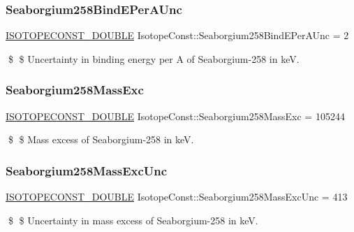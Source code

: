 \subsubsection{\texorpdfstring{Seaborgium258\+Bind\+E\+Per\+A\+Unc}{Seaborgium258BindEPerAUnc}}
{\footnotesize\ttfamily \mbox{\hyperlink{group___isotope_const-_macros_ga8f45a7272ce02c0b4c65c44636ed719a}{I\+S\+O\+T\+O\+P\+E\+C\+O\+N\+S\+T\+\_\+\+D\+O\+U\+B\+LE}} Isotope\+Const\+::\+Seaborgium258\+Bind\+E\+Per\+A\+Unc = 2}

\$ \$ Uncertainty in binding energy per A of Seaborgium-\/258 in keV. \mbox{\label{group___isotope_const-_seaborgium-_sg258_ga57491e59bef7dc6b41bfb0c2bc66e170}} 
\subsubsection{\texorpdfstring{Seaborgium258\+Mass\+Exc}{Seaborgium258MassExc}}
{\footnotesize\ttfamily \mbox{\hyperlink{group___isotope_const-_macros_ga8f45a7272ce02c0b4c65c44636ed719a}{I\+S\+O\+T\+O\+P\+E\+C\+O\+N\+S\+T\+\_\+\+D\+O\+U\+B\+LE}} Isotope\+Const\+::\+Seaborgium258\+Mass\+Exc = 105244}

\$ \$ Mass excess of Seaborgium-\/258 in keV. \mbox{\label{group___isotope_const-_seaborgium-_sg258_ga741cf158c4c2cbb8ee8b8636fc89e79b}} 
\subsubsection{\texorpdfstring{Seaborgium258\+Mass\+Exc\+Unc}{Seaborgium258MassExcUnc}}
{\footnotesize\ttfamily \mbox{\hyperlink{group___isotope_const-_macros_ga8f45a7272ce02c0b4c65c44636ed719a}{I\+S\+O\+T\+O\+P\+E\+C\+O\+N\+S\+T\+\_\+\+D\+O\+U\+B\+LE}} Isotope\+Const\+::\+Seaborgium258\+Mass\+Exc\+Unc = 413}

\$ \$ Uncertainty in mass excess of Seaborgium-\/258 in keV. \mbox{\label{group___isotope_const-_seaborgium-_sg258_ga898e4863c96f23b25c1326d16088ab89}} 
